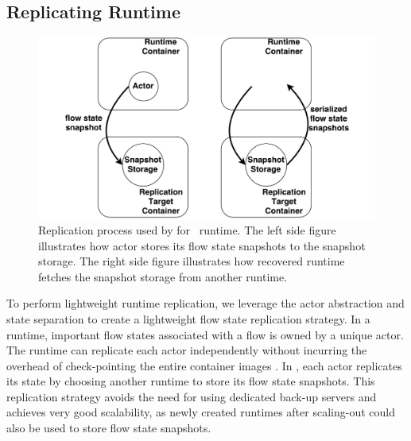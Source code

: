 
\subsection{Replicating Runtime}

\begin{figure}
		\centering
		\includegraphics[width=\columnwidth]{figure/NFActor-Runtime-Replicate.pdf}

		\caption{Replication process used by for \nfactor~runtime. The left side figure illustrates how actor stores its flow state snapshots to the snapshot storage. The right side figure illustrates how recovered runtime fetches the snapshot storage from another runtime. }
\label{fig:replicate} 
\end{figure}

To perform lightweight runtime replication, we leverage the actor 
abstraction and state separation to create a lightweight flow state replication 
strategy. In a runtime, important flow states associated with a flow is 
owned by a unique actor. The runtime can replicate each actor 
independently without incurring the overhead of check-pointing the entire 
container images \cite{sherry2015rollback, rajagopalan2013pico}. In \nfactor, each actor replicates its state by choosing another runtime to store its flow state snapshots. This replication strategy avoids the need for using dedicated back-up servers \cite{sherry2015rollback} and achieves very good scalability, as newly created runtimes after scaling-out could also be used to store flow state snapshots.  

